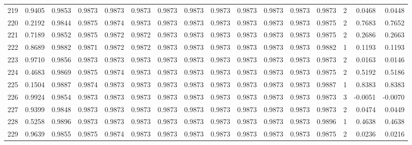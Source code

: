 \begin{tabular}{lrrrrrrrrrrrrrrr}
219 &      0.9405 &  0.9853 &  0.9873 &  0.9873 &  0.9873 &  0.9873 &  0.9873 &  0.9873 &  0.9873 &  0.9873 &   0.9873 &     0.9873 &      2 &                    0.0468 &                     0.0448 \\
220 &      0.2192 &  0.9844 &  0.9875 &  0.9874 &  0.9873 &  0.9873 &  0.9873 &  0.9873 &  0.9873 &  0.9873 &   0.9873 &     0.9875 &      2 &                    0.7683 &                     0.7652 \\
221 &      0.7189 &  0.9852 &  0.9875 &  0.9872 &  0.9872 &  0.9873 &  0.9873 &  0.9873 &  0.9873 &  0.9873 &   0.9873 &     0.9875 &      2 &                    0.2686 &                     0.2663 \\
222 &      0.8689 &  0.9882 &  0.9871 &  0.9872 &  0.9872 &  0.9873 &  0.9873 &  0.9873 &  0.9873 &  0.9873 &   0.9873 &     0.9882 &      1 &                    0.1193 &                     0.1193 \\
223 &      0.9710 &  0.9856 &  0.9873 &  0.9873 &  0.9873 &  0.9873 &  0.9873 &  0.9873 &  0.9873 &  0.9873 &   0.9873 &     0.9873 &      2 &                    0.0163 &                     0.0146 \\
224 &      0.4683 &  0.9869 &  0.9875 &  0.9874 &  0.9873 &  0.9873 &  0.9873 &  0.9873 &  0.9873 &  0.9873 &   0.9873 &     0.9875 &      2 &                    0.5192 &                     0.5186 \\
225 &      0.1504 &  0.9887 &  0.9874 &  0.9873 &  0.9873 &  0.9873 &  0.9873 &  0.9873 &  0.9873 &  0.9873 &   0.9873 &     0.9887 &      1 &                    0.8383 &                     0.8383 \\
226 &      0.9924 &  0.9854 &  0.9873 &  0.9873 &  0.9873 &  0.9873 &  0.9873 &  0.9873 &  0.9873 &  0.9873 &   0.9873 &     0.9873 &      3 &                   -0.0051 &                    -0.0070 \\
227 &      0.9399 &  0.9848 &  0.9873 &  0.9873 &  0.9873 &  0.9873 &  0.9873 &  0.9873 &  0.9873 &  0.9873 &   0.9873 &     0.9873 &      2 &                    0.0474 &                     0.0449 \\
228 &      0.5258 &  0.9896 &  0.9873 &  0.9873 &  0.9873 &  0.9873 &  0.9873 &  0.9873 &  0.9873 &  0.9873 &   0.9873 &     0.9896 &      1 &                    0.4638 &                     0.4638 \\
229 &      0.9639 &  0.9855 &  0.9875 &  0.9874 &  0.9873 &  0.9873 &  0.9873 &  0.9873 &  0.9873 &  0.9873 &   0.9873 &     0.9875 &      2 &                    0.0236 &                     0.0216 \\

\end{tabular}
